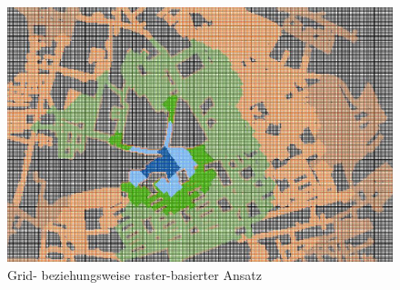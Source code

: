 \begin{figure}[ht]
    \centering
    \includegraphics[width=0.8\linewidth]{start/img/grid_based_approach.png}
    \caption[Grid- beziehungsweise raster-basierter Ansatz]{Grid- beziehungsweise raster-basierter Ansatz~\cite{pedestrian_accessibility_planning}}
    \label{fig:grid_based_approach}
\end{figure}
